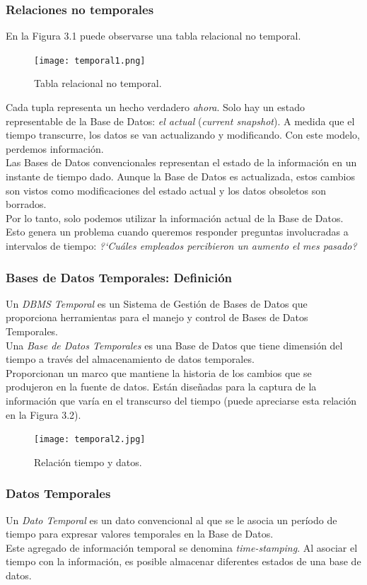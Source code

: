 \documentclass[a4paper,12pt,oneside]{report}
\begin{document}
\subsubsection*{Relaciones no temporales}
En la Figura 3.1 puede observarse una tabla relacional no temporal.
\begin{figure}[h]
\center
\texttt{[image: temporal1.png]}
\caption{Tabla relacional no temporal.}
\end{figure}
Cada tupla representa un hecho verdadero \textit{ahora}. Solo hay un estado representable de la Base de Datos: \textit{el actual} (\textit{current snapshot}).
A medida que el tiempo transcurre, los datos se van actualizando y modificando. Con este modelo, perdemos informaci\'on.\\
Las Bases de Datos convencionales representan el estado de la informaci\'on en un instante de tiempo dado. Aunque la Base de Datos es actualizada, estos cambios son vistos como modificaciones del estado actual y los datos obsoletos son borrados.\\
Por lo tanto, solo podemos utilizar la informaci\'on actual de la Base de Datos.\\
Esto genera un problema cuando queremos responder preguntas involucradas a intervalos de tiempo: \textit{?`Cu\'ales empleados percibieron un aumento el mes pasado?}
\subsubsection*{Bases de Datos Temporales: Definici\'on}
Un \textit{DBMS Temporal} es un Sistema de Gesti\'on de Bases de Datos que proporciona herramientas para el manejo y control de Bases de Datos Temporales.\\
Una \textit{Base de Datos Temporales} es una Base de Datos que tiene dimensi\'on del tiempo a trav\'es del almacenamiento de datos temporales.\\ Proporcionan un marco que mantiene la historia de los cambios que se produjeron en la fuente de datos. Est\'an dise\~nadas para la captura de la informaci\'on que var\'ia en el transcurso del tiempo (puede apreciarse esta relaci\'on en la Figura 3.2).
\begin{figure}[h]
\center \texttt{[image: temporal2.jpg]}
\caption{Relaci\'on tiempo y datos.}
\end{figure}
\subsubsection*{Datos Temporales}
Un \textit{Dato Temporal} es un dato convencional al que se le asocia un per\'iodo de tiempo para expresar valores temporales en la Base de Datos.\\
Este agregado de informaci\'on temporal se denomina \textit{time-stamping}. Al asociar el tiempo con la informaci\'on, es posible almacenar diferentes estados de una base de datos.
\end{document}
